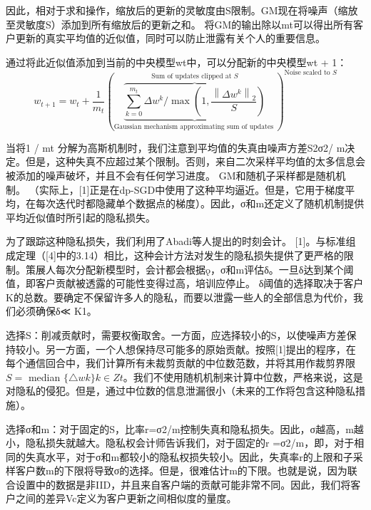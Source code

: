 因此，相对于求和操作，缩放后的更新的灵敏度由S限制。GM现在将噪声（缩放至灵敏度S）添加到所有缩放后的更新之和。 将GM的输出除以mt可以得出所有客户更新的真实平均值的近似值，同时可以防止泄露有关个人的重要信息。

通过将此近似值添加到当前的中央模型wt中，可以分配新的中央模型wt + 1：
\begin{equation}
w_{t+1}=w_{t}+\frac{1}{m_{t}}(\underbrace{\overbrace{\sum_{k=0}^{m_{t}} \Delta w^{k} / \max \left(1, \frac{\left\|\Delta w^{k}\right\|_{2}}{S}\right)}^{\text {Sum of updates clipped at } S}}_{\text {Gaussian mechanism approximating sum of updates }})^{\text {Noise scaled to } S}
\end{equation}


当将1 / mt 分解为高斯机制时，我们注意到平均值的失真由噪声方差S2σ2/ m决定。但是，这种失真不应超过某个限制。否则，来自二次采样平均值的太多信息会被添加的噪声破坏，并且不会有任何学习进度。 GM和随机子采样都是随机机制。 （实际上，[1]正是在dp-SGD中使用了这种平均逼近。但是，它用于梯度平均，在每次迭代时都隐藏单个数据点的梯度）。因此，σ和m还定义了随机机制提供平均近似值时所引起的隐私损失。

为了跟踪这种隐私损失，我们利用了Abadi等人提出的时刻会计。 [1]。与标准组成定理（[4]中的3.14）相比，这种会计方法对发生的隐私损失提供了更严格的限制。策展人每次分配新模型时，会计都会根据ǫ，σ和m评估δ。一旦δ达到某个阈值，即客户贡献被透露的可能性变得过高，培训应停止。 δ阈值的选择取决于客户K的总数。要确定不保留许多人的隐私，而要以泄露一些人的全部信息为代价，我们必须确保δ≪ K1。

选择S：削减贡献时，需要权衡取舍。一方面，应选择较小的S，以使噪声方差保持较小。另一方面，一个人想保持尽可能多的原始贡献。按照[1]提出的程序，在每个通信回合中，我们计算所有未裁剪贡献的中位数范数，并将其用作裁剪界限$S=$ median $\{\triangle w k\} k \in Z t$。我们不使用随机机制来计算中位数，严格来说，这是对隐私的侵犯。但是，通过中位数的信息泄漏很小（未来的工作将包含这种隐私措施）。

选择σ和m：对于固定的S，比率r=σ2/m控制失真和隐私损失。因此，σ越高，m越小，隐私损失就越大。隐私权会计师告诉我们，对于固定的r =σ2/m，即，对于相同的失真水平，对于σ和m都较小的隐私权损失较小。因此，失真率r的上限和子采样客户数m的下限将导致σ的选择。但是，很难估计m的下限。也就是说，因为联合设置中的数据是非IID，并且来自客户端的贡献可能非常不同。因此，我们将客户之间的差异Vc定义为客户更新之间相似度的量度。

